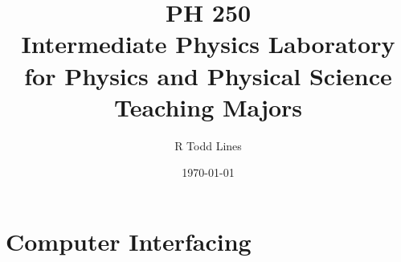 \documentclass{book}
\begin{document}
\frontmatter
\title{{\Huge PH 250}\\
{\Huge {\Large Intermediate Physics Laboratory for Physics and Physical
Science Teaching Majors} }}
\author{R Todd Lines}
\date{\today}
\maketitle
\tableofcontents






\mainmatter

\part{Computer Interfacing}

		
	
		
	
		
	
		
	
		
\end{document}
